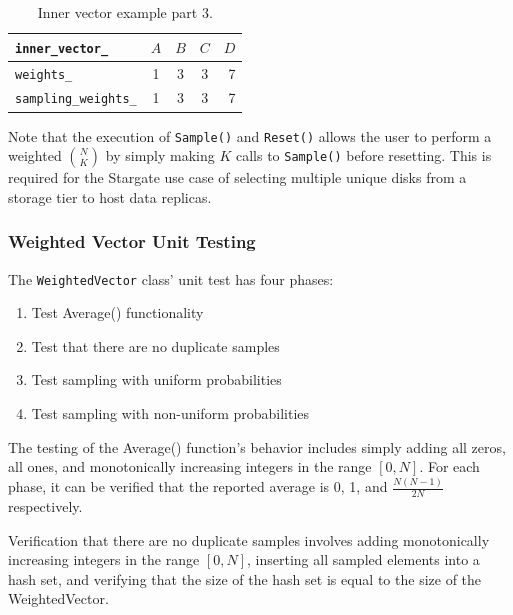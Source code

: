 \documentclass[12pt]{article}
\begin{document}
    \begin{table}[htbp]
      \caption{Inner vector example part 3.}
      \label{tbl:inner-vec-4}
      \begin{center}
      \begin{tabular}{ | l | c | c | c | r | }
        \hline
        \verb|inner_vector_| & $A$ & $B$ & $C$ & $D$ \\ \hline
        \verb|weights_| & 1 & 3 & 3 & 7 \\ \hline
        \verb|sampling_weights_| & 1 & 3 & 3 & 7 \\ \hline
        \hline
      \end{tabular}
      \end{center}
    \end{table}

    Note that the execution of \texttt{Sample()} and \texttt{Reset()} allows the
    user to perform a weighted $\binom{N}{K}$ by simply making $K$ calls to
    \texttt{Sample()} before resetting. This is required for the Stargate use
    case of selecting multiple unique disks from a storage tier to host data
    replicas.

    \FloatBarrier

    \subsubsection{Weighted Vector Unit Testing}

    The \texttt{WeightedVector} class' unit test has four phases:

    \begin{tcolorbox}
    \begin{enumerate}
      \item Test Average() functionality
      \item Test that there are no duplicate samples
      \item Test sampling with uniform probabilities
      \item Test sampling with non-uniform probabilities
    \end{enumerate}
    \end{tcolorbox}

    The testing of the Average() function's behavior includes simply adding all
    zeros, all ones, and monotonically increasing integers in the range
    $[0,N]$. For each phase, it can be verified that the reported average is 0,
    1, and $\frac{N(N-1)}{2N}$ respectively.  

    Verification that there are no duplicate samples involves adding
    monotonically increasing integers in the range $[0,N]$, inserting all
    sampled elements into a hash set, and verifying that the size of the hash
    set is equal to the size of the WeightedVector.
\end{document}
